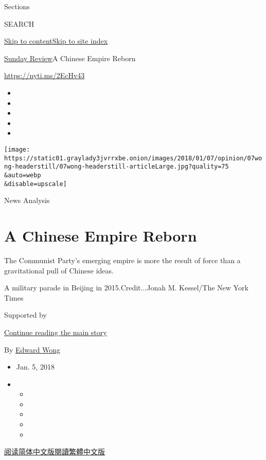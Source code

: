 Sections

SEARCH

\protect\hyperlink{site-content}{Skip to
content}\protect\hyperlink{site-index}{Skip to site index}

\href{/section/opinion/sunday}{Sunday Review}\textbar{}A Chinese Empire
Reborn

\url{https://nyti.ms/2EcHv43}

\begin{itemize}
\item
\item
\item
\item
\item
\end{itemize}

\texttt{[image: https://static01.graylady3jvrrxbe.onion/images/2018/01/07/opinion/07wong-headerstill/07wong-headerstill-articleLarge.jpg?quality=75\\\&auto=webp\\\&disable=upscale]}

News Analysis

\hypertarget{a-chinese-empire-reborn}{%
\section{A Chinese Empire Reborn}\label{a-chinese-empire-reborn}}

The Communist Party's emerging empire is more the result of force than a
gravitational pull of Chinese ideas.

A military parade in Beijing in 2015.Credit...Jonah M. Kessel/The New
York Times

Supported by

\protect\hyperlink{after-sponsor}{Continue reading the main story}

By \href{https://www.nytimes3xbfgragh.onion/by/edward-wong}{Edward Wong}

\begin{itemize}
\item
  Jan. 5, 2018
\item
  \begin{itemize}
  \item
  \item
  \item
  \item
  \item
  \end{itemize}
\end{itemize}

\href{https://cn.nytimes3xbfgragh.onion/opinion/20180108/china-military-economic-power/}{阅读简体中文版}\href{https://cn.nytimes3xbfgragh.onion/opinion/20180108/china-military-economic-power/zh-hant/}{閱讀繁體中文版}

